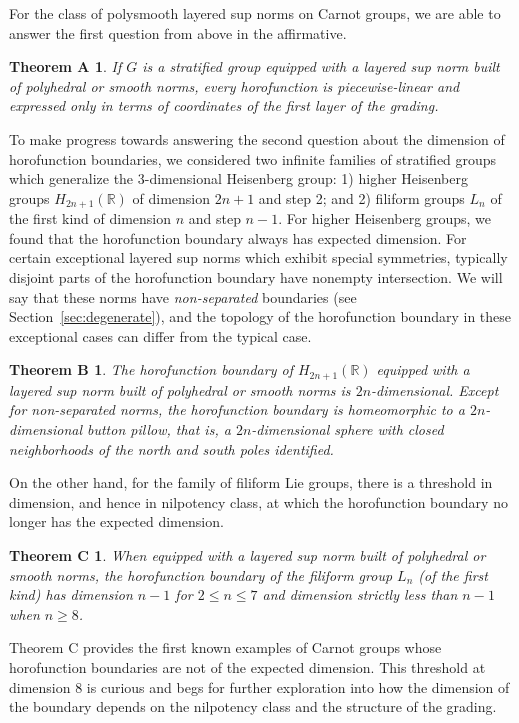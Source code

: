 \documentclass{article}
\newtheorem*{thma}{Theorem A}{\bf}{\it}
\newtheorem*{thmb}{Theorem B}{\bf}{\it}
\newtheorem*{thmc}{Theorem C}{\bf}{\it}
\theoremstyle{definition}
\newcommand{\HHR}{H_{2n+1}(\mathbb{R})}
\newcommand{\R}{{\mathbb R}}
\begin{document}
For the class of polysmooth layered sup norms on Carnot groups, we are able to answer the first question from above in the affirmative. 

\begin{thma}
If $G$ is a stratified group equipped with a layered sup norm built of polyhedral or smooth norms, every horofunction is piecewise-linear and expressed only in terms of coordinates of the first layer of the grading.
\end{thma}

To make progress towards answering the second question about the dimension of horofunction boundaries, we considered two infinite families of stratified groups which generalize the 3-dimensional Heisenberg group: 1) higher Heisenberg groups $H_{2n+1}(\R)$ of dimension $2n+1$ and step 2; and 2) filiform groups $L_n$ of the first kind of dimension $n$ and step $n-1$. For higher Heisenberg groups, we found that the horofunction boundary always has expected dimension. For certain exceptional layered sup norms which exhibit special symmetries, typically disjoint parts of the horofunction boundary have nonempty intersection. We will say that these norms have {\em non-separated} boundaries (see Section~\ref{sec:degenerate}), and the topology of the horofunction boundary in these exceptional cases can differ from the typical case.

\begin{thmb} The horofunction boundary of $\HHR$ equipped with a layered sup norm built of polyhedral or smooth norms is $2n$-dimensional. Except for non-separated norms, the horofunction boundary is homeomorphic to a $2n$-dimensional button pillow, that is, a $2n$-dimensional sphere with closed neighborhoods of the north and south poles identified.
\end{thmb}

On the other hand, for the family of filiform Lie groups, there is a threshold in dimension, and hence in nilpotency class, at which the horofunction boundary no longer has the expected dimension.

\begin{thmc} When equipped with a layered sup norm built of polyhedral or smooth norms, the horofunction boundary of the filiform group $L_n$ (of the first kind) has dimension $n-1$ for $2\leq n \leq 7$ and dimension strictly less than $n-1$ when $n\geq 8$.
\label{thm:thmc}
\end{thmc}

Theorem C provides the first known examples of Carnot groups whose horofunction boundaries are not of the expected dimension. This threshold at dimension 8 is curious and begs for further exploration into how the dimension of the boundary depends on the nilpotency class and the structure of the grading.
\end{document}
